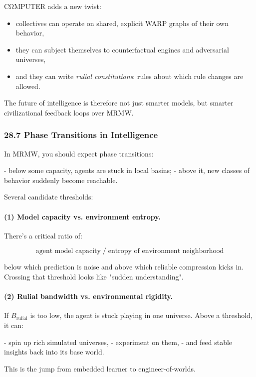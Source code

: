 CΩMPUTER adds a new twist:

\begin{itemize}
  \item collectives can operate on shared, explicit WARP graphs of their own behavior,
  \item they can subject themselves to counterfactual engines and adversarial universes,
  \item and they can write \emph{rulial constitutions}: rules about which rule changes are allowed.
\end{itemize}

The future of intelligence is therefore not just smarter models, but smarter
civilizational feedback loops over MRMW.

\subsubsection*{28.7  Phase Transitions in Intelligence}

In MRMW, you should expect phase transitions:

- below some capacity, agents are stuck in local basins;
- above it, new classes of behavior suddenly become reachable.

Several candidate thresholds:

\paragraph{(1) Model capacity vs. environment entropy.}

There’s a critical ratio of:

\[
  \text{agent model capacity} \; \big/ \; \text{entropy of environment neighborhood}
\]

below which prediction is noise and above which reliable compression kicks in.
Crossing that threshold looks like "sudden understanding".

\paragraph{(2) Rulial bandwidth vs. environmental rigidity.}

If $B_\text{rulial}$ is too low, the agent is stuck playing in one universe.
Above a threshold, it can:

- spin up rich simulated universes,
- experiment on them,
- and feed stable insights back into its base world.

This is the jump from embedded learner to engineer-of-worlds.

